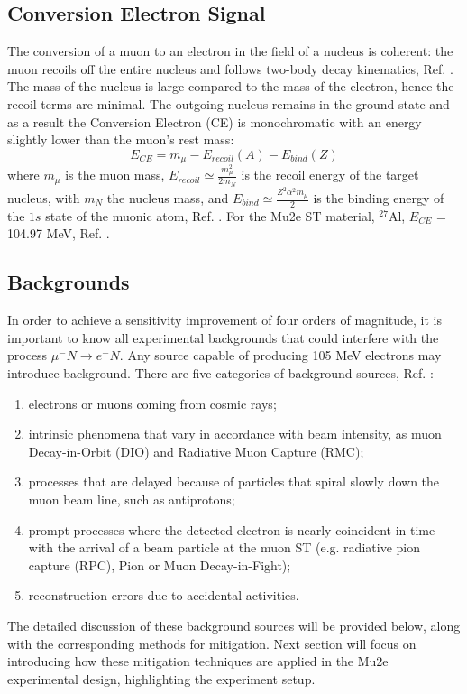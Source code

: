 \subsection{Conversion Electron Signal}
The conversion of a muon to an electron in the field of a nucleus is coherent: 
the muon recoils off the entire nucleus and follows two-body decay kinematics, 
Ref. \cite{bartoszek2015mu2e}. The mass of the nucleus is large compared to the 
mass of the electron, hence the recoil terms are minimal. The outgoing nucleus 
remains in the ground state and as a result the Conversion Electron (CE) is 
monochromatic with an energy slightly lower than the muon's rest mass:
\begin{equation}
    E_{CE} = m_\mu - E_{recoil}(A) - E_{bind}(Z) 
\end{equation}
where $m_\mu$ is the muon mass, $E_{recoil}\simeq \frac{m^2_\mu}{2 m_N}$ is 
the recoil energy of the target nucleus, with $m_N$ the nucleus mass, and 
$E_{bind}\simeq \frac{Z^2 \alpha^2 m_\mu}{2}$ is the binding energy of the 
$1s$ state of the muonic atom, Ref. \cite{universe9010054}. For the Mu2e 
ST material, $^{27}$Al, $E_{CE}$ = 104.97 MeV, Ref. \cite{PhysRevD.84.013006}.
\subsection{Backgrounds}\label{backgrounds}
In order to achieve a sensitivity improvement of four orders of magnitude, 
it is important to know all experimental backgrounds that could interfere with 
the process $\mu^- N \rightarrow e^- N $. Any source capable of producing 105 MeV 
electrons may introduce background. There are five categories of background 
sources, Ref. \cite{bartoszek2015mu2e}:
\begin{enumerate}
\item electrons or muons coming from cosmic rays;
\item intrinsic phenomena that vary in accordance with beam intensity, as muon 
Decay-in-Orbit (DIO) and Radiative Muon Capture (RMC);
\item processes that are delayed because of particles that spiral slowly down the 
muon beam line, such as antiprotons;
\item prompt processes where the detected electron is nearly coincident in time with 
the arrival of a beam particle at the muon ST (e.g. radiative pion capture (RPC), 
Pion or Muon Decay-in-Fight);
\item reconstruction errors due to accidental activities.
\end{enumerate}
The detailed discussion of these background sources will be provided below, along 
with the corresponding methods for mitigation. Next section will focus on introducing 
how these mitigation techniques are applied in the Mu2e experimental design, highlighting 
the experiment setup.

